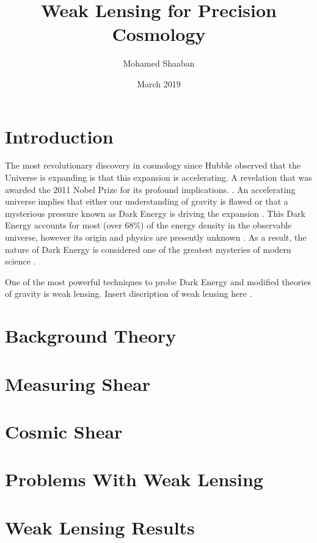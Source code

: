 \documentclass{article}
\title{Weak Lensing for Precision Cosmology}
\author{Mohamed Shaaban}
\date{March 2019}
\begin{document}
\maketitle

\section{Introduction}
The most revolutionary discovery in cosmology since 
Hubble observed that the Universe is expanding is that 
this expansion is accelerating. A revelation that was 
awarded the 2011 Nobel Prize for its profound 
implications. \cite{nobel}. An accelerating
universe implies that either our understanding of gravity is flawed 
or that a mysterious pressure known as Dark Energy is driving the 
expansion \cite{peebles}.
This Dark Energy accounts for most (over 68\%) of the energy density in the observable universe, 
however its origin and physics are presently unknown \cite{planck}. 
As a result, the nature of Dark Energy is considered one of the 
greatest mysteries of modern science \cite{pathfinder}.  
\par
One of the most powerful techniques to probe Dark Energy and modified theories of gravity is weak lensing. Insert discription of weak lensing here \cite{hoekstra}.

\section{Background Theory}




\section{Measuring Shear}

\section{Cosmic Shear}
\cite{lensingbook} \cite{rachel_2018} \cite{hoekstra}

\section{Problems With Weak Lensing}
\cite{massey_2013}

\section{Weak Lensing Results}
\cite{Subaru_2019}



\end{document}
